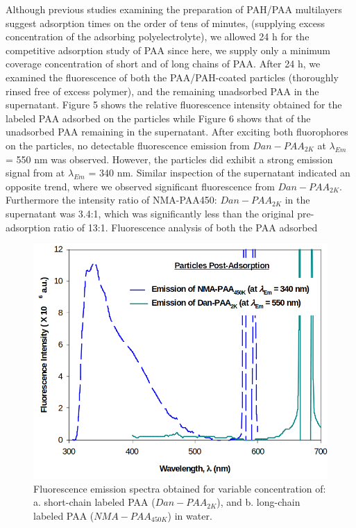 \documentclass[journal=mamobx,manuscript=article]{achemso}
\begin{document}
Although previous studies examining the preparation of PAH/PAA multilayers suggest adsorption times on the order of tens of minutes, (supplying excess concentration of the adsorbing polyelectrolyte), we allowed 24 h for the competitive adsorption study of PAA since here, we supply only a minimum coverage concentration of short and of long chains of PAA.  After 24 h, we examined the fluorescence of both the PAA/PAH-coated particles (thoroughly rinsed free of excess polymer), and the remaining unadsorbed PAA in the supernatant.  Figure 5 shows the relative fluorescence intensity obtained for the labeled PAA adsorbed on the particles while Figure 6 shows that of the unadsorbed PAA remaining in the supernatant.  After exciting both fluorophores on the particles, no detectable fluorescence emission from $Dan-PAA_{2K}$ at $\lambda_{Em}$ = 550 nm was observed.  However, the particles did exhibit a strong emission signal from at $\lambda_{Em}$ = 340 nm.  Similar inspection of the supernatant indicated an opposite trend, where we observed significant fluorescence from $Dan-PAA_{2K}$.  Furthermore the intensity ratio of NMA-PAA450: $Dan-PAA_{2K}$ in the supernatant was 3.4:1, which was significantly less than the original pre-adsorption ratio of 13:1.  Fluorescence analysis of both the PAA adsorbed 


\begin{figure}[H]
\includegraphics[scale=1.75]{fig5.png}
\caption{Fluorescence emission spectra obtained for variable concentration of: a. short-chain labeled PAA ($Dan-PAA_{2K}$), and b. long-chain labeled PAA ($NMA-PAA_{450K}$) in water.}
\label{figure 5}
\end{figure}
\end{document}
